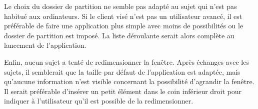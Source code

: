 \documentclass[a4paper, 12pt]{article}
\begin{document}
    Le choix du dossier de partition ne semble pas adapté au sujet qui n'est pas habitué aux ordinateurs. Si le client visé n'est pas un utilisateur avancé, il est préférable de faire une application plus simple avec moins de possibilités ou le dossier de partition est imposé. La liste déroulante serait alors complète au lancement de l'application.
    
    Enfin, aucun sujet a tenté de redimensionner la fenêtre. Après échanges avec les sujets, il semblerait que la taille par défaut de l'application est adaptée, mais qu'aucune information n'est visible concernant la possibilité d'agrandir la fenêtre. Il serait préférable d'insérer un petit élément dans le coin inférieur droit pour indiquer à l'utilisateur qu'il est possible de la redimensionner.
    
\end{document}
